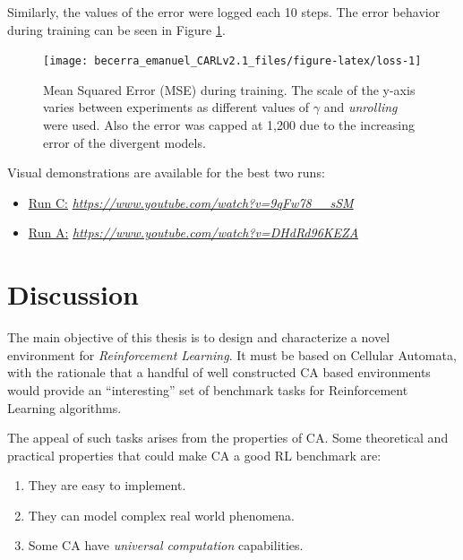 \documentclass[
  12pt,
  openany]{book}
\providecommand{\tightlist}{%
  \setlength{\itemsep}{0pt}\setlength{\parskip}{0pt}}
\begin{document}
Similarly, the values of the error were logged each 10 steps. The error behavior during training can be seen in Figure \ref{fig:loss}.



\begin{figure}

{\centering \texttt{[image: becerra\_emanuel\_CARLv2.1\_files/figure-latex/loss-1]} 

}

\caption{Mean Squared Error (MSE) during training. The scale of the y-axis varies between experiments as different values of \(\gamma\) and \emph{unrolling} were used. Also the error was capped at 1,200 due to the increasing error of the divergent models.}\label{fig:loss}
\end{figure}

Visual demonstrations are available for the best two runs:

\begin{itemize}
\tightlist
\item
  \href{https://www.youtube.com/watch?v=9qFw78__sSM}{Run C:} \emph{\url{https://www.youtube.com/watch?v=9qFw78__sSM}}
\item
  \href{https://www.youtube.com/watch?v=DHdRd96KEZA}{Run A:} \emph{\url{https://www.youtube.com/watch?v=DHdRd96KEZA}}
\end{itemize}

\hypertarget{discussion}{%
\section{Discussion}\label{discussion}}

The main objective of this thesis is to design and characterize a novel environment for \emph{Reinforcement Learning}. It must be based on Cellular Automata, with the rationale that a handful of well constructed CA based environments would provide an ``interesting'' set of benchmark tasks for Reinforcement Learning algorithms.

The appeal of such tasks arises from the properties of CA. Some theoretical and practical properties that could make CA a good RL benchmark are:

\begin{enumerate}
\def\labelenumi{\arabic{enumi}.}
\tightlist
\item
  They are easy to implement.
\item
  They can model complex real world phenomena.
\item
  Some CA have \emph{universal computation} capabilities.
\end{enumerate}
\end{document}
